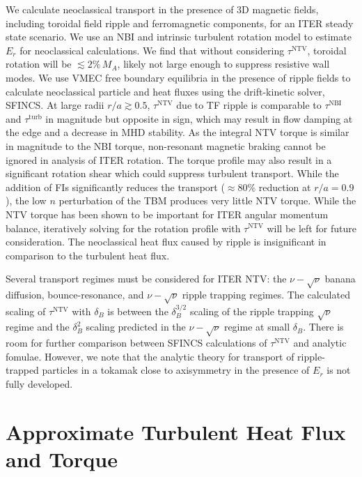 \documentclass[aip, pop, preprint]{revtex4-1}
\numberwithin{figure}{section}
\numberwithin{equation}{section}
\begin{document}
We calculate neoclassical transport in the presence of 3D magnetic fields, including toroidal field ripple and ferromagnetic components, for an ITER steady state scenario. We use an NBI and intrinsic turbulent rotation model to estimate $E_r$ for neoclassical calculations. We find that without considering $\tau^{\mathrm{NTV}}$, toroidal rotation will be $\lesssim 2\% \,M_A$, likely not large enough to suppress resistive wall modes.\cite{Liu2004} We use VMEC free boundary equilibria in the presence of ripple fields to calculate neoclassical particle and heat fluxes using the drift-kinetic solver, SFINCS. At large radii $r/a \gtrsim 0.5$, $\tau^{\mathrm{NTV}}$ due to TF ripple is comparable to $\tau^{\mathrm{NBI}}$ and $\tau^{\mathrm{turb}}$ in magnitude but opposite in sign, which may result in flow damping at the edge and a decrease in MHD stability. As the integral NTV torque is similar in magnitude to the NBI torque, non-resonant magnetic braking cannot be ignored in analysis of ITER rotation. The torque profile may also result in a significant rotation shear which could suppress turbulent transport. While the addition of FIs significantly reduces the transport ($\approx 80\%$ reduction at $r/a = 0.9$), the low $n$ perturbation of the TBM produces very little NTV torque. While the NTV torque has been shown to be important for ITER angular momentum balance, iteratively solving for the rotation profile with $\tau^{\mathrm{NTV}}$ will be left for future consideration. The neoclassical heat flux caused by ripple is insignificant in comparison to the turbulent heat flux. 

Several transport regimes must be considered for ITER NTV: the $\nu-\sqrt{\nu}$ banana diffusion, bounce-resonance, and $\nu-\sqrt{\nu}$ ripple trapping regimes. The calculated scaling of $\tau^{\mathrm{NTV}}$ with $\delta_B$ is between the $\delta_B^{3/2}$ scaling of the ripple trapping $\sqrt{\nu}$ regime and the $\delta_B^2$ scaling predicted in the $\nu-\sqrt{\nu}$ regime at small $\delta_B$. There is room for further comparison between SFINCS calculations of $\tau^{\mathrm{NTV}}$ and analytic fomulae. However, we note that the analytic theory for transport of ripple-trapped particles in a tokamak close to axisymmetry in the presence of $E_r$ is not fully developed. 

\appendix

\section{Approximate Turbulent Heat Flux and Torque}\label{turbQ}
\end{document}

